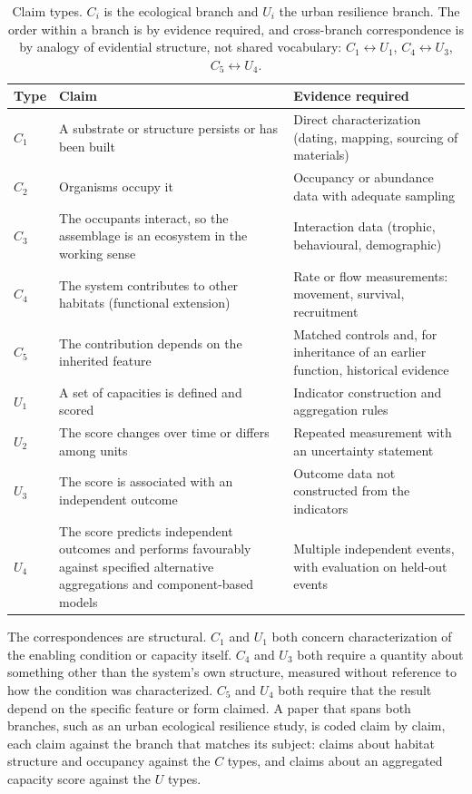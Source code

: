 \documentclass[11pt]{article}
\theoremstyle{definition}
\theoremstyle{remark}
\begin{document}
\begin{table}[h]
\centering
\small
\begin{tabular}{@{}p{}p{}p{}@{}}
\toprule
Type & Claim & Evidence required \\
\midrule
$C_1$ & A substrate or structure persists or has been built & Direct characterization (dating, mapping, sourcing of materials) \\
$C_2$ & Organisms occupy it & Occupancy or abundance data with adequate sampling \\
$C_3$ & The occupants interact, so the assemblage is an ecosystem in the working sense & Interaction data (trophic, behavioural, demographic) \\
$C_4$ & The system contributes to other habitats (functional extension) & Rate or flow measurements: movement, survival, recruitment \\
$C_5$ & The contribution depends on the inherited feature & Matched controls and, for inheritance of an earlier function, historical evidence \\
\midrule
$U_1$ & A set of capacities is defined and scored & Indicator construction and aggregation rules \\
$U_2$ & The score changes over time or differs among units & Repeated measurement with an uncertainty statement \\
$U_3$ & The score is associated with an independent outcome & Outcome data not constructed from the indicators \\
$U_4$ & The score predicts independent outcomes and performs favourably against specified alternative aggregations and component-based models & Multiple independent events, with evaluation on held-out events \\
\bottomrule
\end{tabular}
\caption{Claim types. $C_i$ is the ecological branch and $U_i$ the urban resilience branch. The order within a branch is by evidence required, and cross-branch correspondence is by analogy of evidential structure, not shared vocabulary: $C_1\leftrightarrow U_1$, $C_4\leftrightarrow U_3$, $C_5\leftrightarrow U_4$.}\label{tab:ladder}
\end{table}

The correspondences are structural. $C_1$ and $U_1$ both concern characterization of the enabling condition or capacity itself. $C_4$ and $U_3$ both require a quantity about something other than the system's own structure, measured without reference to how the condition was characterized. $C_5$ and $U_4$ both require that the result depend on the specific feature or form claimed. A paper that spans both branches, such as an urban ecological resilience study, is coded claim by claim, each claim against the branch that matches its subject: claims about habitat structure and occupancy against the $C$ types, and claims about an aggregated capacity score against the $U$ types.
\end{document}
